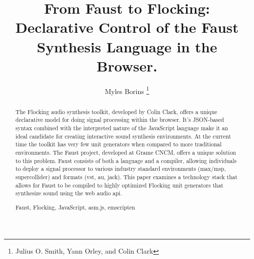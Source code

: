 \documentclass[runningheads,a4paper]{llncs}
\newcommand{\keywords}[1]{\par\addvspace\baselineskip
\noindent\keywordname\enspace\ignorespaces#1}
\begin{document}
\mainmatter  %

\title{From Faust to Flocking: Declarative Control of the Faust Synthesis Language in the Browser.}


%
%
\author{Myles Borins \thanks{Julius O. Smith, Yann Orley, and Colin Clark}}
%


%
%


\maketitle


\begin{abstract}
The Flocking audio synthesis toolkit, developed by Colin Clark, offers a unique declarative model for doing signal processing within the browser.  It's JSON-based syntax combined with the interpreted nature of the JavaScript language make it an ideal candidate for creating interactive sound synthesis environments.  At the current time the toolkit has very few unit generators when compared to more traditional environments.  The Faust project, developed at Grame CNCM, offers a unique solution to this problem.  Faust consists of both a language and a compiler, allowing individuals to deploy a signal processor to various industry standard environments (max/msp, supercollider) and formats (vst, au, jack).  This paper examines a technology stack that allows for Faust to be compiled to highly optimized Flocking unit generators that synthesize sound using the web audio api.  


\keywords{Faust, Flocking, JavaScript, asm.js, emscripten}
\end{abstract}
\end{document}
